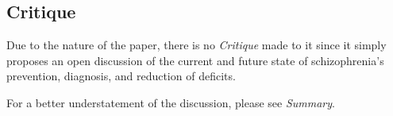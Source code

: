 \documentclass{Paper_Summary}
\begin{document}
\makepapertitle

\breakline

\begin{center}
    \section*{Critique}
\end{center}

    Due to the nature of the paper, there is no \emph{Critique} made to it since it simply proposes an open discussion of the current and future state of schizophrenia's prevention, diagnosis, and reduction of deficits.

    For a better understatement of the discussion, please see \emph{Summary}.

\breakline
\end{document}
